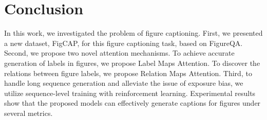 \documentclass[11pt,a4paper]{article}
\begin{document}



\section{Conclusion}
In this work, we investigated the problem of figure captioning. 
First, we presented a new dataset, FigCAP, for this figure captioning task, based on FigureQA. Second, we propose two novel attention mechanisms. To achieve accurate generation of labels in figures, we propose Label Maps Attention. To discover the relations between figure labels, we propose Relation Maps Attention. Third, to handle long sequence generation and alleviate the issue of exposure bias, we utilize sequence-level training with reinforcement learning. Experimental results show that the proposed models can effectively generate captions for figures under several metrics. 

\end{document}
